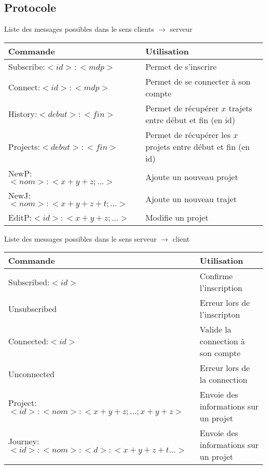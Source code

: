 \documentclass[a4paper, 11pt]{report}
\begin{document}
\subsection{Protocole}
	\begin{center}
		Liste des messages possibles dans le sens clients $\rightarrow$ serveur
		\par
		\begin{tabular}{|l|l|}
			\hline
			Commande & Utilisation\\
			\hline
			Subscribe:$<id>:<mdp>$ & Permet de s'inscrire\\
			\hline
			Connect:$<id>:<mdp>$ & Permet de se connecter à son compte\\
			\hline
			\hline
			History:$<debut>:<fin>$ & Permet de récupérer $x$ trajets entre début et fin (en id)\\
			\hline
			Projects:$<debut>:<fin>$ & Permet de récupérer les $x$ projets entre début et fin (en id)\\
			\hline
			\hline
			NewP:$<nom>:<x+y+z;...>$ & Ajoute un nouveau projet\\
			\hline
			NewJ:$<nom>:<x+y+z+t;...>$ & Ajoute un nouveau trajet\\
			\hline
			EditP:$<id>:<x+y+z;...>$ & Modifie un projet\\
			\hline
		\end{tabular}
	\end{center}
	\begin{center}
		Liste des messages possibles dans le sens serveur $\rightarrow$ client
		\par
		\begin{tabular}{|l|l|}
			\hline
			Commande & Utilisation\\
			\hline
			Subscribed:$<id>$ & Confirme l'inscription \\
			\hline
			Unsubscribed & Erreur lors de l'inscripton \\
			\hline
			Connected:$<id>$ & Valide la connection à son compte\\
			\hline
			Unconnected & Erreur lors de la connection \\
			\hline
			\hline
			Project:$<id>:<nom>:<x+y+z;...;x+y+z>$ & Envoie des informations sur un projet\\
			\hline
			Journey:$<id>:<nom>:<d>:<x+y+z+t...>$ & Envoie des informations sur un projet\\
			\hline
		\end{tabular}
	\end{center}
\end{document}
